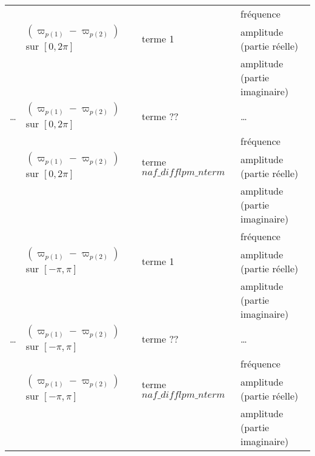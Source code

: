 \documentclass[11pt]{article}
\begin{document}
\begin{tabularx}{\textwidth}{|l|l|l|X|}
 & &   & fr\'equence\\
 &$(\varpi_{p(1)}-\varpi_{p(2)})$ sur $[0,2\pi]$& terme 1 & amplitude (partie r\'eelle)\\
 &    & &amplitude (partie imaginaire)\\ \hline
\dots & $(\varpi_{p(1)}-\varpi_{p(2)})$ sur $[0,2\pi]$& terme ?? &\dots \\ \hline
 & &    &fr\'equence\\
 & $(\varpi_{p(1)}-\varpi_{p(2)})$ sur $[0,2\pi]$ & terme $naf\_difflpm\_nterm$ & amplitude (partie r\'eelle)\\
 &   & &amplitude (partie imaginaire)\\ \hline
 & &   & fr\'equence\\
 &$(\varpi_{p(1)}-\varpi_{p(2)})$ sur $[-\pi,\pi]$& terme 1 & amplitude (partie r\'eelle)\\
 &    & &amplitude (partie imaginaire)\\ \hline
\dots & $(\varpi_{p(1)}-\varpi_{p(2)})$ sur $[-\pi,\pi]$& terme ?? &\dots \\ \hline
 & &    &fr\'equence\\
 & $(\varpi_{p(1)}-\varpi_{p(2)})$ sur $[-\pi,\pi]$ & terme $naf\_difflpm\_nterm$ & amplitude (partie r\'eelle)\\
 &   & &amplitude (partie imaginaire)\\ \hline
\end{tabularx}
\end{document}
